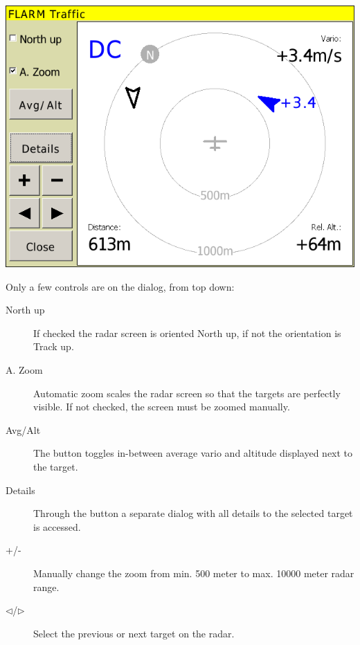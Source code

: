 \documentclass[a4paper,12pt]{refrep}
\begin{document}
\begin{center}
\includegraphics[angle=0,width=\linewidth,keepaspectratio='true']{figures/dialog-flarm1.png}
\end{center}

Only a few controls are on the dialog, from top down:
\begin{description}
\item[North up]  If checked the radar screen is oriented North up, if not the
orientation is Track up.
\item[A. Zoom]  Automatic zoom scales the radar screen so that the targets are
perfectly visible. If not checked, the screen must be zoomed manually.
\item[Avg/Alt]  The button toggles in-between average vario and altitude
displayed next to the target.
\item[Details]  Through the button a separate dialog with all details to the
selected target is accessed. 
\item[+/-]  Manually change the zoom from min. 500 meter to max. 10000
meter radar range.
\item[$\triangleleft$/$\triangleright$]  Select the previous or
next target on the radar.
\end{description}
\end{document}
